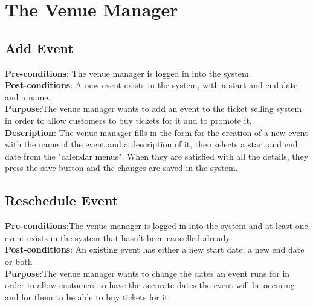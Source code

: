 \section{The Venue Manager}

%
%
%
%
%


\subsection{Add Event}
\textbf{Pre-conditions}: The venue manager is logged in into the system.\\

\textbf{Post-conditions}: A new event exists in the system, with a start
and end date and a name.\\

\textbf{Purpose}:The venue manager wants to add an event to the ticket
selling system in order to allow customers to buy tickets for it and
to promote it.\\

\textbf{Description}: The venue manager fills in the form for the creation
of a new event with the name of the event and a description of it, then
selects a start and end date from the "calendar menus". When they are
satisfied with all the details, they press the save button and the
changes are saved in the system.

\subsection{Reschedule Event}
\textbf{Pre-conditions}:The venue manager is logged in into the system
and at least one event exists in the system that hasn't been cancelled
already\\

\textbf{Post-conditions}: An existing event has either a new start date,
a new end date or both\\

\textbf{Purpose}:The venue manager wants to change the dates an event
runs for in order to allow customers to have the accurate dates the
event will be occuring and for them to be able to buy tickets for it\\

